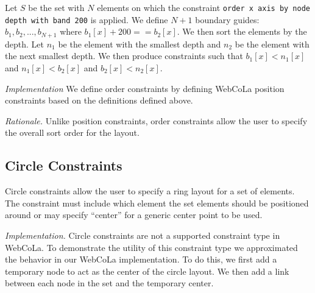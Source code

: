 \begin{definition}
Let $S$ be the set with $N$ elements on which the constraint 
\texttt{order x axis by node depth with band 200} is applied.
We define $N+1$ boundary guides: $b_1, b_2, ..., b_{N+1}$ where
$b_1[x] + 200 == b_2[x]$. We then sort the elements by the depth.
Let $n_1$ be the element with the smallest depth and $n_2$ be the element 
with the next smallest depth. We then produce constraints such that
$b_1[x] < n_1[x]$ and $n_1[x] < b_2[x]$ and $b_2[x] < n_2[x]$.
\end{definition}

\emph{Implementation}
We define order constraints by defining WebCoLa position constraints based
on the definitions defined above. 


\emph{Rationale.} Unlike position constraints, order constraints allow the
user to specify the overall sort order for the layout.

\subsection{Circle Constraints}

Circle constraints allow the user to specify a ring layout for a set of
elements. The constraint must include which element the set elements should
be positioned around or may specify ``center'' for a generic center point
to be used.



\emph{Implementation.}
Circle constraints are not a supported constraint type in WebCoLa. To 
demonstrate the utility of this constraint type we approximated the behavior
in our WebCoLa implementation. To do this, we first add a temporary node
to act as the center of the circle layout. We then add a link between each 
node in the set and the temporary center. 


